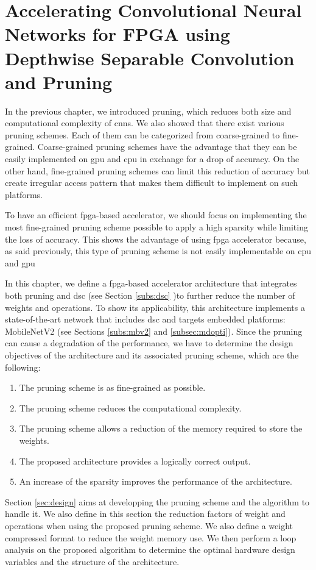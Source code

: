 \chapter{Accelerating Convolutional Neural Networks for FPGA using Depthwise Separable Convolution and Pruning} \label{chap:pratique}
%
%
In the previous chapter, we introduced pruning, which reduces both size and computational complexity of \acrshort{cnn}s. We also showed that there exist various pruning schemes. Each of them can be categorized from coarse-grained to fine-grained. Coarse-grained pruning schemes have the advantage that they can be easily implemented on \acrshort{gpu} and \acrshort{cpu} in exchange for a drop of accuracy. On the other hand, fine-grained pruning schemes can limit this reduction of accuracy but create irregular access pattern that makes them difficult to implement on such platforms. 

To have an efficient \acrshort{fpga}-based accelerator, we should focus on implementing the most fine-grained pruning scheme possible to apply a high sparsity while limiting the loss of accuracy. This shows the advantage of using \acrshort{fpga} accelerator because, as said previously, this type of pruning scheme is not easily implementable on \acrshort{cpu} and \acrshort{gpu}

In this chapter, we define a \acrshort{fpga}-based accelerator architecture that integrates both pruning and \acrshort{dsc} (see Section \ref{subs:dsc} )to further reduce the number of weights and operations. To show its applicability, this architecture implements a state-of-the-art network that includes \acrshort{dsc} and targets embedded platforms: MobileNetV2 (see Sections \ref{subs:mbv2} and \ref{subsec:mdopti}). Since the pruning can cause a degradation of the performance, we have to determine the design objectives of the architecture and its associated pruning scheme, which are the following:
%
\begin{enumerate}
    \item The pruning scheme is as fine-grained as possible.
    \item The pruning scheme reduces the computational complexity.
    \item The pruning scheme allows a reduction of the memory required to store the weights.
    \item The proposed architecture provides a logically correct output.
    \item An increase of the sparsity improves the performance of the architecture.
\end{enumerate}
%
Section \ref{sec:design} aims at developping the pruning scheme and the algorithm to handle it. We also define in this section the reduction factors of weight and operations when using the proposed pruning scheme. We also define a weight compressed format to reduce the weight memory use. We then perform a loop analysis on the proposed algorithm to determine the optimal hardware design variables and the structure of the architecture.

